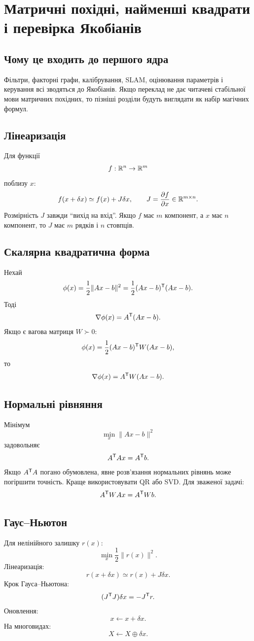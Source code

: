 
\chapter{Матричні похідні, найменші квадрати і перевірка Якобіанів}

\section{Чому це входить до першого ядра}

Фільтри, факторні графи, калібрування, SLAM, оцінювання параметрів і керування всі зводяться до Якобіанів. Якщо переклад не дає читачеві стабільної мови матричних похідних, то пізніші розділи будуть виглядати як набір магічних формул.

\section{Лінеаризація}

Для функції
\[
f:\mathbb{R}^n\to\mathbb{R}^m
\]
поблизу $x$:
\[
f(x+\delta x)\simeq f(x)+J\delta x,
\qquad
J=\frac{\partial f}{\partial x}\in\mathbb{R}^{m\times n}.
\]
Розмірність $J$ завжди ``вихід на вхід''. Якщо $f$ має $m$ компонент, а $x$ має $n$ компонент, то $J$ має $m$ рядків і $n$ стовпців.

\section{Скалярна квадратична форма}

Нехай
\[
\phi(x)=\frac12\|Ax-b\|^2
=\frac12(Ax-b)^{\mathsf{T}}(Ax-b).
\]
Тоді
\[
\nabla\phi(x)=A^{\mathsf{T}}(Ax-b).
\]
Якщо є вагова матриця $W\succ0$:
\[
\phi(x)=\frac12(Ax-b)^{\mathsf{T}} W(Ax-b),
\]
то
\[
\nabla\phi(x)=A^{\mathsf{T}} W(Ax-b).
\]

\section{Нормальні рівняння}

Мінімум
\[
\min_x \|Ax-b\|^2
\]
задовольняє
\[
A^{\mathsf{T}} A x=A^{\mathsf{T}} b.
\]
Якщо $A^{\mathsf{T}} A$ погано обумовлена, явне розв'язання нормальних рівнянь може погіршити точність. Краще використовувати QR або SVD. Для зваженої задачі:
\[
A^{\mathsf{T}} W A x=A^{\mathsf{T}} Wb.
\]

\section{Гаус--Ньютон}

Для нелінійного залишку $r(x)$:
\[
\min_x \frac12\|r(x)\|^2.
\]
Лінеаризація:
\[
r(x+\delta x)\simeq r(x)+J\delta x.
\]
Крок Гауса--Ньютона:
\[
(J^{\mathsf{T}} J)\delta x=-J^{\mathsf{T}} r.
\]
Оновлення:
\[
x\leftarrow x+\delta x.
\]
На многовидах:
\[
X\leftarrow X\oplus\delta x.
\]

